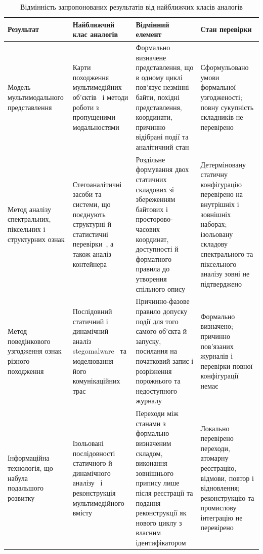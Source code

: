 \begin{table}[p]
\centering
\footnotesize
\caption{Відмінність запропонованих результатів від найближчих класів аналогів}
\label{tab:ch3_novelty_comparison}
\begin{tabularx}{\textwidth}{@{}>{\raggedright\arraybackslash}p{}>{\raggedright\arraybackslash}p{}Y>{\raggedright\arraybackslash}p{0.20\textwidth}@{}}
\toprule
Результат & Найближчий клас аналогів & Відмінний елемент & Стан перевірки \\
\midrule
Модель мультимодального представлення & Карти походження мультимедійних об’єктів~\cite{kiltz2024trace,vielhauer2025modeling} і методи роботи з пропущеними модальностями~\cite{ma2021smil} & Формально визначене представлення, що в одному циклі пов’язує незмінні байти, похідні представлення, координати, причинно відібрані події та аналітичний стан & Сформульовано умови формальної узгодженості; повну сукупність складників не перевірено \\
Метод аналізу спектральних, піксельних і структурних ознак & Стегоаналітичні засоби та системи, що поєднують структурні й статистичні перевірки~\cite{badar2025stegomalware,kadebu2023hybrid}, а також аналіз контейнера~\cite{koch2022polyglot} & Роздільне формування двох статичних складових зі збереженням байтових і просторово-часових координат, доступності й форматного правила до утворення спільного опису & Детерміновану статичну конфігурацію перевірено на внутрішніх і зовнішніх наборах; ізольовану складову спектрального та піксельного аналізу зовні не підтверджено \\
Метод поведінкового узгодження ознак різного походження & Послідовний статичний і динамічний аналіз stegomalware~\cite{kadebu2023hybrid,badar2025stegomalware} та моделювання його комунікаційних трас~\cite{vielhauer2025modeling} & Причинно-фазове правило допуску події для того самого об’єкта й запуску, посилання на початковий запис і розрізнення порожнього та недоступного журналу & Формально визначено; причинно пов’язаних журналів і перевірки повної конфігурації немає \\
Інформаційна технологія, що набула подальшого розвитку & Ізольовані послідовності статичного й динамічного аналізу~\cite{kadebu2023hybrid,abbadini2023sandboxing} і реконструкція мультимедійного вмісту~\cite{belkind2023icdr} & Переходи між станами з формально визначеним складом, виконання зовнішнього припису лише після реєстрації та подання реконструкції як нового циклу з власним ідентифікатором & Локально перевірено переходи, атомарну реєстрацію, відмови, повтор і відновлення; реконструкцію та промислову інтеграцію не перевірено \\
\bottomrule
\end{tabularx}
\end{table}

